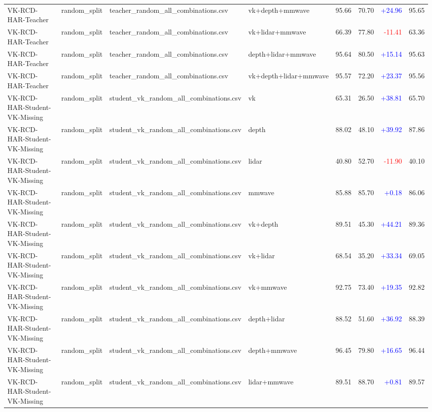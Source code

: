\documentclass[10pt]{article}
\begin{document}
\begin{longtable}{llllrrrr}
VK-RCD-HAR-Teacher & random\_split & teacher\_random\_all\_combinations.csv & vk+depth+mmwave & 95.66 & 70.70 & \textcolor{blue}{+24.96} & 95.65\\
VK-RCD-HAR-Teacher & random\_split & teacher\_random\_all\_combinations.csv & vk+lidar+mmwave & 66.39 & 77.80 & \textcolor{red}{-11.41} & 63.36\\
VK-RCD-HAR-Teacher & random\_split & teacher\_random\_all\_combinations.csv & depth+lidar+mmwave & 95.64 & 80.50 & \textcolor{blue}{+15.14} & 95.63\\
VK-RCD-HAR-Teacher & random\_split & teacher\_random\_all\_combinations.csv & vk+depth+lidar+mmwave & 95.57 & 72.20 & \textcolor{blue}{+23.37} & 95.56\\
VK-RCD-HAR-Student-VK-Missing & random\_split & student\_vk\_random\_all\_combinations.csv & vk & 65.31 & 26.50 & \textcolor{blue}{+38.81} & 65.70\\
VK-RCD-HAR-Student-VK-Missing & random\_split & student\_vk\_random\_all\_combinations.csv & depth & 88.02 & 48.10 & \textcolor{blue}{+39.92} & 87.86\\
VK-RCD-HAR-Student-VK-Missing & random\_split & student\_vk\_random\_all\_combinations.csv & lidar & 40.80 & 52.70 & \textcolor{red}{-11.90} & 40.10\\
VK-RCD-HAR-Student-VK-Missing & random\_split & student\_vk\_random\_all\_combinations.csv & mmwave & 85.88 & 85.70 & \textcolor{blue}{+0.18} & 86.06\\
VK-RCD-HAR-Student-VK-Missing & random\_split & student\_vk\_random\_all\_combinations.csv & vk+depth & 89.51 & 45.30 & \textcolor{blue}{+44.21} & 89.36\\
VK-RCD-HAR-Student-VK-Missing & random\_split & student\_vk\_random\_all\_combinations.csv & vk+lidar & 68.54 & 35.20 & \textcolor{blue}{+33.34} & 69.05\\
VK-RCD-HAR-Student-VK-Missing & random\_split & student\_vk\_random\_all\_combinations.csv & vk+mmwave & 92.75 & 73.40 & \textcolor{blue}{+19.35} & 92.82\\
VK-RCD-HAR-Student-VK-Missing & random\_split & student\_vk\_random\_all\_combinations.csv & depth+lidar & 88.52 & 51.60 & \textcolor{blue}{+36.92} & 88.39\\
VK-RCD-HAR-Student-VK-Missing & random\_split & student\_vk\_random\_all\_combinations.csv & depth+mmwave & 96.45 & 79.80 & \textcolor{blue}{+16.65} & 96.44\\
VK-RCD-HAR-Student-VK-Missing & random\_split & student\_vk\_random\_all\_combinations.csv & lidar+mmwave & 89.51 & 88.70 & \textcolor{blue}{+0.81} & 89.57\\

\end{longtable}
\end{document}
